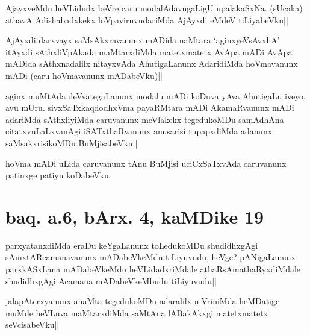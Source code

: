 \begin{artha}
AjayxveMdu heVLidudx beVre caru modalAdavugaLigU upalakaSxNa. (sUcaka) 
athavA Adishabadxkekx loVpaviruvudariMda AjAyxdi eMdeV tiLiyabeVku||
\end{artha}


\begin{artha}
AjAyxdi darxvayx saMsAkxravanunx mADida naMtara `aginxyeVsAvxhA' 
itAyxdi sAthxliVpAkada maMtarxdiMda matetxmatetx AvApa mADi AvApa 
mADida sAthxnadalilx nitayxvAda AhutigaLanunx AdaridiMda hoVmavanunx 
mADi (caru hoVmavanunx mADabeVku)||
\end{artha}


\begin{artha}
aginx muMtAda deVvategaLanunx modalu mADi koDuva yAva AhutigaLu iveyo, 
avu mUru. sivxSaTxkaqdodhxVma payaRMtara mADi AkamaRvanunx mADi 
adariMda sAthxliyiMda caruvanunx meVlakekx tegedukoMDu samAdhAna 
citatxvuLaLxvanAgi iSATxthaRvanunx anusarisi tupapxdiMda adanunx 
saMsakxrisikoMDu BuMjisabeVku||
\end{artha}


\begin{artha}
hoVma mADi uLida caruvanunx tAnu BuMjisi uciCxSaTxvAda caruvanunx 
patinxge patiyu koDabeVku.
\end{artha}

\section*{baq. a.6, bArx. 4, kaMDike 19}

\stext

\begin{artha}
parxyatanxdiMda eraDu keYgaLanunx toLedukoMDu shudidhxgAgi 
sAmxtARcamanavanunx mADabeVkeMdu tiLiyuvudu, heVge? pANigaLanunx 
parxkASxLana mADabeVkeMdu heVLidadxriMdale athaRsAmathaRyxdiMdale 
shudidhxgAgi Acamana mADabeVkeMbudu tiLiyuvudu|| 
\end{artha}


\begin{artha}
jalapAterxyanunx anaMta tegedukoMDu adaralilx niVriniMda heMDatige 
muMde heVLuva maMtarxdiMda saMtAna lABakAkxgi matetxmatetx 
seVcisabeVku||
\end{artha}

